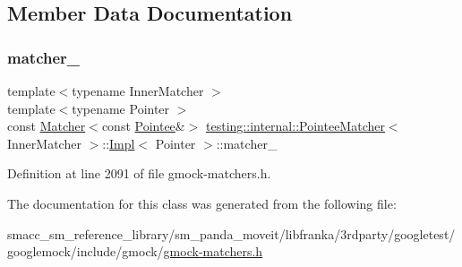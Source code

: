 \subsection{Member Data Documentation}
\mbox{\label{classtesting_1_1internal_1_1PointeeMatcher_1_1Impl_a8b6095eca981f76156d7e301cef455a0}} 
\subsubsection{\texorpdfstring{matcher\+\_\+}{matcher\_}}
{\footnotesize\ttfamily template$<$typename Inner\+Matcher $>$ \\
template$<$typename Pointer $>$ \\
const \hyperlink{classtesting_1_1Matcher}{Matcher}$<$const \hyperlink{classtesting_1_1internal_1_1PointeeMatcher_1_1Impl_af28def7caaa864201e03f6fcd54a841b}{Pointee}\&$>$ \hyperlink{classtesting_1_1internal_1_1PointeeMatcher}{testing\+::internal\+::\+Pointee\+Matcher}$<$ Inner\+Matcher $>$\+::\hyperlink{classtesting_1_1internal_1_1PointeeMatcher_1_1Impl}{Impl}$<$ Pointer $>$\+::matcher\+\_\+\hspace{0.3cm}{\ttfamily [private]}}



Definition at line 2091 of file gmock-\/matchers.\+h.



The documentation for this class was generated from the following file\+:\begin{DoxyCompactItemize}
\item 
smacc\+\_\+sm\+\_\+reference\+\_\+library/sm\+\_\+panda\+\_\+moveit/libfranka/3rdparty/googletest/googlemock/include/gmock/\hyperlink{gmock-matchers_8h}{gmock-\/matchers.\+h}\end{DoxyCompactItemize}

